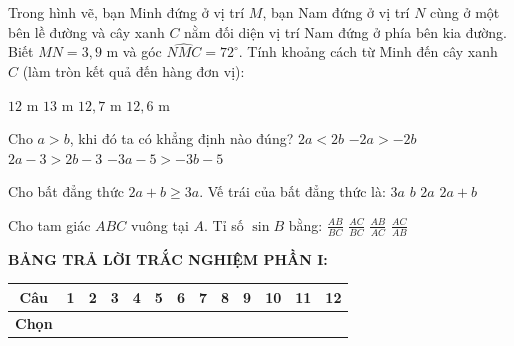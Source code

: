 \documentclass[12pt,a4paper]{article}
\begin{document}
\begin{ex}
Trong hình vẽ, bạn Minh đứng ở vị trí $M$, bạn Nam đứng ở vị trí $N$ cùng ở một bên lề đường và cây xanh $C$ nằm đối diện vị trí Nam đứng ở phía bên kia đường. Biết $MN = 3{,}9\text{ m}$ và góc $\widehat{NMC} = 72^\circ$. Tính khoảng cách từ Minh đến cây xanh $C$ (làm tròn kết quả đến hàng đơn vị):
\begin{center}
\end{center}
\choice
{$12\text{ m}$}
{\True $13\text{ m}$}
{$12{,}7\text{ m}$}
{$12{,}6\text{ m}$}
\end{ex}

\begin{ex}
Cho $a > b$, khi đó ta có khẳng định nào đúng?
\choice
{$2a < 2b$}
{$-2a > -2b$}
{\True $2a - 3 > 2b - 3$}
{$-3a - 5 > -3b - 5$}
\end{ex}

\begin{ex}
Cho bất đẳng thức $2a + b \ge 3a$. Vế trái của bất đẳng thức là:
\choice
{$3a$}
{$b$}
{$2a$}
{\True $2a + b$}
\end{ex}

\begin{ex}
Cho tam giác $ABC$ vuông tại $A$. Tỉ số $\sin B$ bằng:
\choice
{$\frac{AB}{BC}$}
{\True $\frac{AC}{BC}$}
{$\frac{AB}{AC}$}
{$\frac{AC}{AB}$}
\end{ex}


\vspace{1mm}
\noindent\textbf{BẢNG TRẢ LỜI TRẮC NGHIỆM PHẦN I:}
\begin{center}
\begin{tabular}{|c|c|c|c|c|c|c|c|c|c|c|c|c|}
\hline
\textbf{Câu} & \textbf{1} & \textbf{2} & \textbf{3} & \textbf{4} & \textbf{5} & \textbf{6} & \textbf{7} & \textbf{8} & \textbf{9} & \textbf{10} & \textbf{11} & \textbf{12} \\
\hline
\textbf{Chọn} & \rule{0pt}{0.65cm} & & & & & & & & & & & \\
\hline
\end{tabular}
\end{center}
\vspace{2mm}
\end{document}
